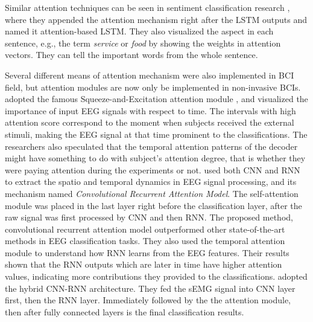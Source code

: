 Similar attention techniques can be seen in sentiment classification research \citep{wang2016attention}, 
where they appended the attention mechanism right after the LSTM outputs and named it attention-based LSTM.
They also visualized the aspect in each sentence, e.g., the term \textit{service} or \textit{food} by showing the weights in attention vectors.
They can tell the important words from the whole sentence.

Several different means of attention mechanism were also implemented in BCI field,
but attention modules are now only be implemented in non-invasive BCIs.
\cite{li2020multi} adopted the famous Squeeze-and-Excitation attention module \citep{hu2018squeeze},
and visualized the importance of input EEG signals with respect to time.
The intervals with high attention score correspond to the moment when subjects received the external stimuli, 
making the EEG signal at that time prominent to the classifications.
The researchers also speculated that the temporal attention patterns of the decoder might have something to do with subject's attention degree,
that is whether they were paying attention during the experiments or not. 
\cite{zhang2020motor} used both CNN and RNN to extract the spatio and temporal dynamics in EEG signal processing,
and its mechanism named \textit{Convolutional Recurrent Attention Model}.
The self-attention module was placed in the last layer right before the classification layer,
after the raw signal was first processed by CNN and then RNN.
The proposed method, convolutional recurrent attention model outperformed other state-of-the-art methods in EEG classification tasks.
They also used the temporal attention module to understand how RNN learns from the EEG features.
Their results shown that the RNN outputs which are later in time have higher attention values,
indicating more contributions they provided to the classifications.
\citep{hu2018novel} adopted the hybrid CNN-RNN architecture.
They fed the sEMG signal into CNN layer first, then the RNN layer.
Immediately followed by the the attention module,
then after fully connected layers is the final classification results.



